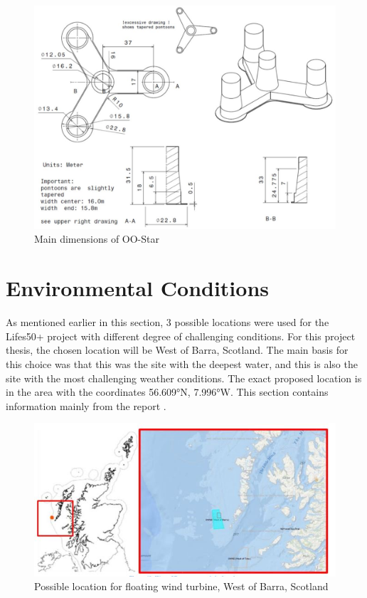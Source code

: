 \begin{figure}[H]
\centering
\includegraphics[scale=0.6]{figures/designoostar}
\caption[$\; \:$Main dimensions of OO-Star]{Main dimensions of OO-Star \cite{Lifes50+D4.2} }
 \label{fig:designoostar}
\end{figure}

\section{Environmental Conditions}
As mentioned earlier in this section, 3 possible locations were used for the Lifes50+ project with different degree of challenging conditions. For this project thesis, the chosen location will be West of Barra, Scotland. The main basis for this choice was that this was the site with the deepest water, and this is also the site with the most challenging weather conditions. The exact proposed location is in the area with the coordinates 56.609°N, 7.996°W.  This section contains information mainly from the report \cite{Lifes50+D1.1}.


\begin{figure}[H]
\centering
\includegraphics[scale=0.8]{figures/wob}
\caption[$\; \:$West of Barra, Scotland]{Possible location for floating wind turbine, West of Barra, Scotland \cite{Lifes50+D1.1} }
 \label{fig:wob}
\end{figure}

